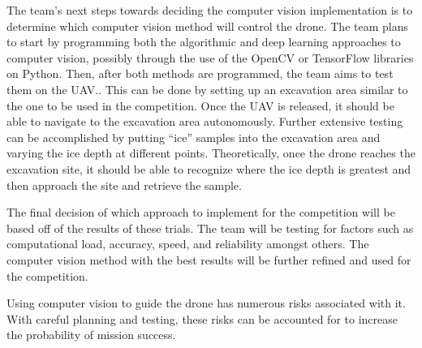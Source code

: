 The team’s next steps towards deciding the computer vision implementation is to determine which computer vision method will control the drone. The team plans to start by programming both the algorithmic and deep learning approaches to computer vision, possibly through the use of the OpenCV or TensorFlow libraries on Python. Then, after both methods are programmed, the team aims to test them on the UAV.. This can be done by setting up an excavation area similar to the one to be used in the competition. Once the UAV is released, it should be able to navigate to the excavation area autonomously. Further extensive testing can be accomplished by putting “ice” samples into the excavation area and varying the ice depth at different points. Theoretically, once the drone reaches the excavation site, it should be able to recognize where the ice depth is greatest and then approach the site and retrieve the sample.

The final decision of which approach to implement for the competition will be based off of the results of these trials. The team will be testing for factors such as computational load, accuracy, speed, and reliability amongst others. The computer vision method with the best results will be further refined and used for the competition.

Using computer vision to guide the drone has numerous risks associated with it. With careful planning and testing, these risks can be accounted for to increase the probability of mission success.

